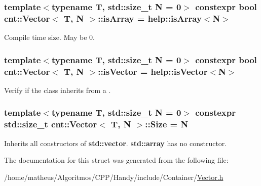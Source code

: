 \subsubsection[{\texorpdfstring{is\+Array}{isArray}}]{\setlength{\rightskip}{0pt plus 5cm}template$<$typename T, std\+::size\+\_\+t N = 0$>$ constexpr bool {\bf cnt\+::\+Vector}$<$ T, N $>$\+::is\+Array = help\+::is\+Array$<$N$>$\hspace{0.3cm}{\ttfamily [static]}}\hypertarget{structcnt_1_1Vector_a58f5309a3c8f7e8104df0ca84b375e8f}{}\label{structcnt_1_1Vector_a58f5309a3c8f7e8104df0ca84b375e8f}


Compile time size. May be 0. 

\subsubsection[{\texorpdfstring{is\+Vector}{isVector}}]{\setlength{\rightskip}{0pt plus 5cm}template$<$typename T, std\+::size\+\_\+t N = 0$>$ constexpr bool {\bf cnt\+::\+Vector}$<$ T, N $>$\+::is\+Vector = help\+::is\+Vector$<$N$>$\hspace{0.3cm}{\ttfamily [static]}}\hypertarget{structcnt_1_1Vector_a0a764a7179b03ef780fe06e92bd8d368}{}\label{structcnt_1_1Vector_a0a764a7179b03ef780fe06e92bd8d368}


Verify if the class inherits from a \textquotesingle{}. 

\subsubsection[{\texorpdfstring{Size}{Size}}]{\setlength{\rightskip}{0pt plus 5cm}template$<$typename T, std\+::size\+\_\+t N = 0$>$ constexpr {\bf std\+::size\+\_\+t} {\bf cnt\+::\+Vector}$<$ T, N $>$\+::Size = N\hspace{0.3cm}{\ttfamily [static]}}\hypertarget{structcnt_1_1Vector_a6d8675b8183ba8999ffb76735ecb9c76}{}\label{structcnt_1_1Vector_a6d8675b8183ba8999ffb76735ecb9c76}


Inherits all constructors of {\bf std\+::vector}. {\bf std\+::array} has no constructor. 



The documentation for this struct was generated from the following file\+:\begin{DoxyCompactItemize}
\item 
/home/matheus/\+Algoritmos/\+C\+P\+P/\+Handy/include/\+Container/\hyperlink{Vector_8h}{Vector.\+h}\end{DoxyCompactItemize}
